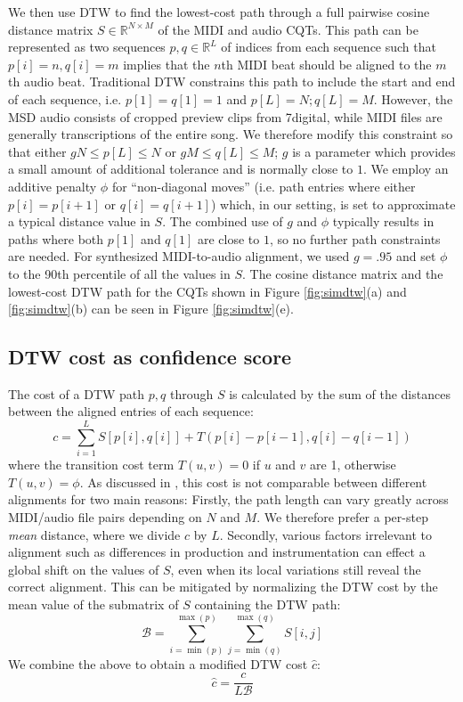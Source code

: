 \documentclass{article}
\begin{document}
We then use DTW to find the lowest-cost path through a full pairwise cosine distance matrix $S \in \mathbb{R}^{N \times M}$ of the MIDI and audio CQTs.
This path can be represented as two sequences $p, q \in \mathbb{R}^L$ of indices from each sequence such that $p[i] = n, q[i] = m$ implies that the $n$th MIDI beat should be aligned to the $m$th audio beat.
Traditional DTW constrains this path to include the start and end of each sequence, i.e. $p[1] = q[1] = 1$ and $p[L] = N; q[L] = M$.
However, the MSD audio consists of cropped preview clips from 7digital, while MIDI files are generally transcriptions of the entire song.
We therefore modify this constraint so that either $gN \le p[L] \le N$ or $gM \le q[L] \le M$; $g$ is a parameter which provides a small amount of additional tolerance and is normally close to $1$.
We employ an additive penalty $\phi$ for ``non-diagonal moves'' (i.e. path entries where either $p[i] = p[i + 1]$ or $q[i] = q[i + 1]$) which, in our setting, is set to approximate a typical distance value in $S$.
The combined use of $g$ and $\phi$ typically results in paths where both $p[1]$ and $q[1]$ are close to $1$, so no further path constraints are needed.
For synthesized MIDI-to-audio alignment, we used $g = .95$ and set $\phi$ to the 90th percentile of all the values in $S$.
The cosine distance matrix and the lowest-cost DTW path for the CQTs shown in Figure \ref{fig:simdtw}(a) and \ref{fig:simdtw}(b) can be seen in Figure \ref{fig:simdtw}(e).

\subsection{DTW cost as confidence score}
\label{sec:score}

The cost of a DTW path $p, q$ through $S$ is calculated by the sum of the distances between the aligned entries of each sequence:
$$
c = \sum_{i = 1}^L S[p[i], q[i]] + T(p[i] - p[i-1], q[i] - q[i-1])
$$
where the transition cost term $T(u,v) = 0$ if $u$ and $v$ are 1, otherwise $T(u, v) = \phi$.
As discussed in \cite{hu2003polyphonic}, this cost is not comparable between different alignments for two main reasons: Firstly, the path length can vary greatly across MIDI/audio file pairs depending on $N$ and $M$.
We therefore prefer a per-step {\em mean} distance, where we divide $c$ by $L$.
Secondly, various factors irrelevant to alignment such as differences in production and instrumentation can effect a global shift on the values of $S$, even when its local variations still reveal the correct alignment.  
This can be mitigated by normalizing the DTW cost by the mean value of the submatrix of $S$ containing the DTW path:
$$
\mathcal{B} = \sum_{i = \min(p)}^{\max(p)} \sum_{j = \min(q)}^{\max(q)} S[i, j] 
$$
We combine the above to obtain a modified DTW cost $\hat{c}$:
$$
\hat{c} = \frac{c}{L \mathcal{B}}
$$
\end{document}
